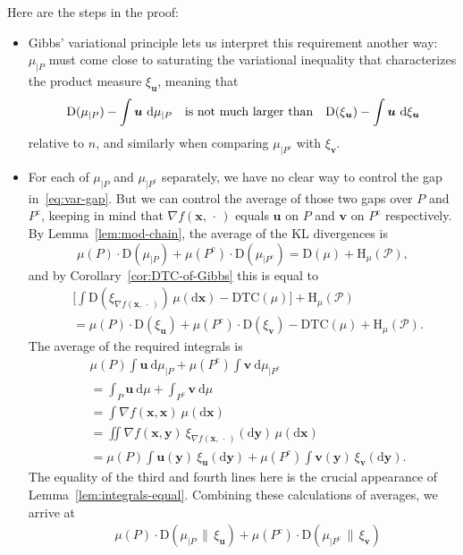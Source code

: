 \documentclass[aop,preprint]{imsart}
\theoremstyle{remark}
\renewcommand{\bf}[1]{\boldsymbol{#1}}
\renewcommand{\rm}[1]{\mathrm{#1}}
\newcommand{\rmH}{\mathrm{H}}
\renewcommand{\d}{\mathrm{d}}
\renewcommand{\P}{\mathcal{P}}
\newcommand{\DTC}{\mathrm{DTC}}
\newcommand{\rmD}{\mathrm{D}}
\begin{document}
Here are the steps in the proof:
\begin{itemize}
\item Gibbs' variational principle lets us interpret this requirement another way: $\mu_{|P}$ must come close to saturating the variational inequality that characterizes the product measure $\xi_{\bf{u}}$, meaning that
	\begin{equation}\label{eq:var-gap}
\rmD(\mu_{|P}) - \int \bf{u}\ \d\mu_{|P} \quad \hbox{is not much larger than}\quad \rmD(\xi_{\bf{u}}) - \int \bf{u}\ \d\xi_{\bf{u}}
\end{equation}
relative to $n$, and similarly when comparing $\mu_{|P^{\rm{c}}}$ with $\xi_{\bf{v}}$.
\item For each of $\mu_{|P}$ and $\mu_{|P^\rm{c}}$ separately, we have no clear way to control the gap in~\eqref{eq:var-gap}.  But we can control the average of those two gaps over $P$ and $P^{\rm{c}}$, keeping in mind that $\nabla f(\bf{x},\,\cdot\,)$ equals $\bf{u}$ on $P$ and $\bf{v}$ on $P^{\rm{c}}$ respectively.  By Lemma~\ref{lem:mod-chain}, the average of the KL divergences is
\[\mu(P)\cdot \rmD(\mu_{|P}) + \mu(P^\rm{c})\cdot \rmD(\mu_{|P^\rm{c}}) = \rmD(\mu) + \rmH_\mu(\P),\]
and by Corollary~\ref{cor:DTC-of-Gibbs} this is equal to
\begin{align*}
&\Big[\int\rmD(\xi_{\nabla f(\bf{x},\,\cdot\,)})\,\mu(\d\bf{x}) - \DTC(\mu)\Big] + \rmH_\mu(\P)\\
&= \mu(P)\cdot \rmD(\xi_{\bf{u}}) + \mu(P^{\rm{c}})\cdot \rmD(\xi_{\bf{v}}) - \DTC(\mu) + \rmH_\mu(\P).
\end{align*}
The average of the required integrals is
\begin{align*}
&\mu(P) \int \bf{u}\ \d\mu_{|P} + \mu(P^\rm{c})\int \bf{v}\ \d\mu_{|P^\rm{c}}\\ &=\int_P \bf{u}\ \d\mu + \int_{P^{\rm{c}}} \bf{v}\ \d\mu\\ &= \int \nabla f(\bf{x},\bf{x})\ \mu(\d\bf{x})\\
&= \iint \nabla f(\bf{x},\bf{y})\ \xi_{\nabla f(\bf{x},\,\cdot\,)}(\d\bf{y})\, \mu(\d\bf{x})\\
&= \mu(P) \int \bf{u}(\bf{y})\ \xi_{\bf{u}}(\d\bf{y}) + \mu(P^\rm{c})\int \bf{v}(\bf{y})\ \xi_{\bf{v}}(\d\bf{y}).
\end{align*}
The equality of the third and fourth lines here is the crucial appearance of Lemma~\ref{lem:integrals-equal}.  Combining these calculations of averages, we arrive at
\begin{align}\label{eq:pre-Dem-id}
&\mu(P)\cdot \rmD(\mu_{|P}\,\|\,\xi_{\bf{u}}) + \mu(P^\rm{c})\cdot \rmD(\mu_{|P^\rm{c}}\,\|\,\xi_{\bf{v}}) \nonumber\\

\end{align}
\end{itemize}
\end{document}
